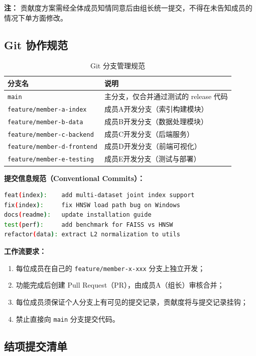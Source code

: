 \documentclass[a4paper]{article}
\begin{document}
\noindent\textbf{注：} 贡献度方案需经全体成员知情同意后由组长统一提交，不得在未告知成员的情况下单方面修改。

\subsection{Git 协作规范}

\begin{table}[H]
\centering
\small
\caption{Git 分支管理规范}
\begin{tabularx}{\linewidth}{p{5cm}X}
\toprule
分支名 & 说明 \\
\midrule
\texttt{main} & 主分支，仅合并通过测试的 release 代码 \\
\texttt{feature/member-a-index} & 成员A开发分支（索引构建模块） \\
\texttt{feature/member-b-data} & 成员B开发分支（数据处理模块） \\
\texttt{feature/member-c-backend} & 成员C开发分支（后端服务） \\
\texttt{feature/member-d-frontend} & 成员D开发分支（前端可视化） \\
\texttt{feature/member-e-testing} & 成员E开发分支（测试与部署） \\
\bottomrule
\end{tabularx}
\end{table}

\textbf{提交信息规范（Conventional Commits）：}
\begin{lstlisting}[language=bash, caption=Git提交信息格式规范]
feat(index):    add multi-dataset joint index support
fix(index):     fix HNSW load path bug on Windows
docs(readme):   update installation guide
test(perf):     add benchmark for FAISS vs HNSW
refactor(data): extract L2 normalization to utils
\end{lstlisting}

\textbf{工作流要求：}
\begin{enumerate}
    \item 每位成员在自己的 \texttt{feature/member-x-xxx} 分支上独立开发；
    \item 功能完成后创建 Pull Request（PR），由成员A（组长）审核合并；
    \item 每位成员须保证个人分支上有可见的提交记录，贡献度将与提交记录挂钩；
    \item 禁止直接向 \texttt{main} 分支提交代码。
\end{enumerate}

\subsection{结项提交清单}
\end{document}
